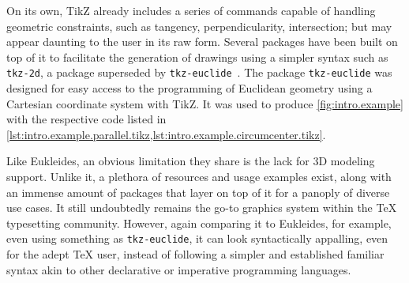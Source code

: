 On its own, \acs{TikZ} already includes a series of commands capable of handling
geometric constraints, such as tangency, perpendicularity, intersection; but may
appear daunting to the user in its raw form.  Several packages have been built
on top of it to facilitate the generation of drawings using a simpler syntax
such as \texttt{tkz-2d}, a package superseded by
\texttt{tkz-euclide}~\cite{Matthes:2011:tkz-euclide-manual}.  The package
\texttt{tkz-euclide} was designed for easy access to the programming of
Euclidean geometry using a Cartesian coordinate system with TikZ.  It was used
to produce \cref{fig:intro.example} with the respective code listed in
\cref{lst:intro.example.parallel.tikz,lst:intro.example.circumcenter.tikz}.

Like Eukleides, an obvious limitation they share is the lack for 3D modeling
support.  Unlike it, a plethora of resources and usage examples exist, along
with an immense amount of packages that layer on top of it for a panoply of
diverse use cases.  It still undoubtedly remains the go-to graphics system
within the \TeX{} typesetting community.  However, again comparing it to
Eukleides, for example, even using something as \texttt{tkz-euclide}, it can
look syntactically appalling, even for the adept \TeX{} user, instead of
following a simpler and established familiar syntax akin to other declarative or
imperative programming languages.
